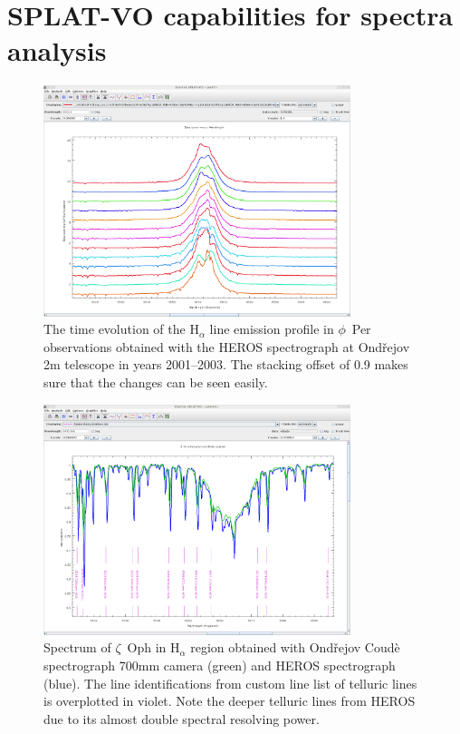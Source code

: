 \documentclass[final,authoryear,5p,times,twocolumn]{elsarticle}
\begin{document}
\section{SPLAT-VO capabilities  for spectra analysis}
%
\begin{figure}[t]
\begin{center}
\includegraphics[width=0.8\textwidth]{phiper-heros-stack.pdf}
\caption{The time evolution of the H$_\alpha$ line emission profile in
$\phi$~Per observations obtained with the HEROS spectrograph at Ond\v{r}ejov 2m
telescope in years 2001--2003. The stacking offset of 0.9  makes sure that the changes can be seen easily.}

\label{fig:phiper-heros-stack}
\end{center}
\end{figure}

\begin{figure}[t]
\begin{center}
\includegraphics[width=0.8\textwidth]{zetoph2sp-id.pdf}
\caption{Spectrum of $\zeta$~Oph in H$_\alpha$ region  obtained with Ond\v{r}ejov Coud\`e
  spectrograph 700mm camera (green) and HEROS spectrograph (blue). The line
  identifications from custom line list of telluric lines is overplotted in violet. Note the deeper
  telluric lines from HEROS due to its almost double spectral resolving power.}
\label{fig:zetoph2sp-id}
\end{center}
\end{figure}
\end{document}
